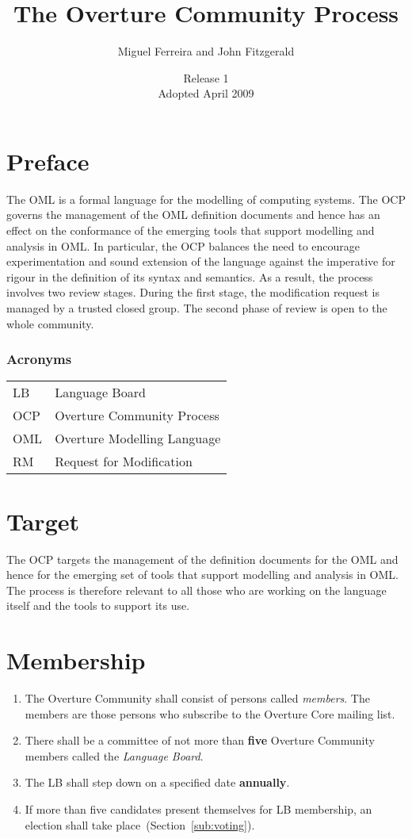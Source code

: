 \documentclass[]{article}
\title{The Overture Community Process}
\author{Miguel Ferreira and John Fitzgerald}
\date{Release 1 \\
      Adopted April 2009}
\begin{document}
\maketitle

\section*{Preface}
The OML is a formal language for the modelling of computing
systems. The OCP governs the management of the OML definition
documents and hence has an effect on the conformance of the emerging
tools that support modelling and analysis in OML. In particular, the
OCP balances the need to encourage experimentation and sound extension
of the language against the imperative for rigour in the definition of
its syntax and semantics. As a result, the process involves two review
stages. During the first stage, the modification request is managed by
a trusted closed group. The second phase of review is open to the
whole community.

\subsubsection*{Acronyms}
\begin{tabular}{ll}
LB  & Language Board \\
OCP & Overture Community Process \\
OML & Overture Modelling Language \\
RM  & Request for Modification
\end{tabular}

\section{Target} %
\label{sec:target}

The OCP targets the management of the definition documents for the OML
and hence for the emerging set of tools that support modelling and
analysis in OML. The process is therefore relevant to all those who
are working on the language itself and the tools to support its use.

\section{Membership} %
\label{sec:members_organization}
\begin{enumerate}
\item The Overture Community shall consist of persons called
  \emph{members}. The members are those persons who subscribe to the
  Overture Core mailing list.

\item There shall be a committee of not more than \textbf{five}
  Overture Community members called the \emph{Language Board}.

\item The LB shall step down on a specified date \textbf{annually}.

\item If more than five candidates present themselves for LB
  membership, an election shall take place~(Section~\ref{sub:voting}). 

\end{enumerate}
\end{document}
